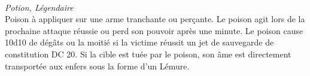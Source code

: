 \\
{\small \it Potion, Légendaire}\\
     Poison à appliquer sur une arme tranchante ou perçante. Le poison agit 
lors de la prochaine attaque réussie ou perd son pouvoir après une minute. Le
poison cause 10d10 de dégâts ou la moitié si la victime réussit un jet de 
sauvegarde de constitution DC 20. Si la cible est tuée par le poison, son âme
est directement transportée aux enfers sous la forme d'un Lémure. \\


